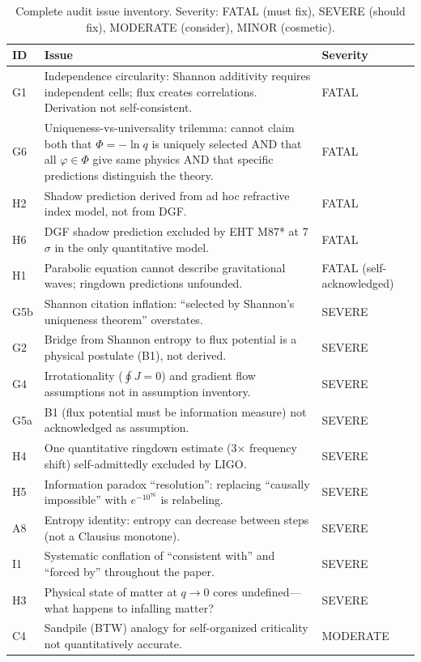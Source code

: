 \documentclass[reprint]{revtex4-2}
\begin{document}
\begin{table}[h]
\caption{Complete audit issue inventory. Severity: FATAL (must fix), SEVERE (should fix), MODERATE (consider), MINOR (cosmetic).}
\begin{tabular}{p{0.5cm}p{7cm}l}
\toprule
ID & Issue & Severity \\
\midrule
G1 & Independence circularity: Shannon additivity requires independent cells; flux creates correlations. Derivation not self-consistent. & FATAL \\
G6 & Uniqueness-vs-universality trilemma: cannot claim both that $\Phi=-\ln q$ is uniquely selected AND that all $\varphi\in\Phi$ give same physics AND that specific predictions distinguish the theory. & FATAL \\
H2 & Shadow prediction derived from ad hoc refractive index model, not from DGF. & FATAL \\
H6 & DGF shadow prediction excluded by EHT M87* at 7$\sigma$ in the only quantitative model. & FATAL \\
H1 & Parabolic equation cannot describe gravitational waves; ringdown predictions unfounded. & FATAL (self-acknowledged) \\
G5b & Shannon citation inflation: ``selected by Shannon's uniqueness theorem'' overstates. & SEVERE \\
G2 & Bridge from Shannon entropy to flux potential is a physical postulate (B1), not derived. & SEVERE \\
G4 & Irrotationality ($\oint J=0$) and gradient flow assumptions not in assumption inventory. & SEVERE \\
G5a & B1 (flux potential must be information measure) not acknowledged as assumption. & SEVERE \\
H4 & One quantitative ringdown estimate (3$\times$ frequency shift) self-admittedly excluded by LIGO. & SEVERE \\
H5 & Information paradox ``resolution'': replacing ``causally impossible'' with $e^{-10^{76}}$ is relabeling. & SEVERE \\
A8 & Entropy identity: entropy can decrease between steps (not a Clausius monotone). & SEVERE \\
I1 & Systematic conflation of ``consistent with'' and ``forced by'' throughout the paper. & SEVERE \\
H3 & Physical state of matter at $q\to0$ cores undefined---what happens to infalling matter? & SEVERE \\
C4 & Sandpile (BTW) analogy for self-organized criticality not quantitatively accurate. & MODERATE \\

\end{tabular}
\end{table}
\end{document}
